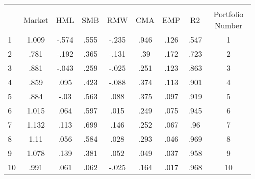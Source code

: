 {
\def\sym#1{\ifmmode^{#1}\else\(^{#1}\)\fi}
\begin{tabular}{l*{1}{cccccccc}}
\hline\hline
            &\multicolumn{8}{c}{}                                                                                   \\
            &     Market &         HML&         SMB&         RMW&         CMA&         EMP&          R2&Portfolio Number\\
\hline
1           &       1.009&       -.574&        .555&       -.235&        .946&        .126&        .547&           1\\
2           &        .781&       -.192&        .365&       -.131&         .39&        .172&        .723&           2\\
3           &        .881&       -.043&        .259&       -.025&        .251&        .123&        .863&           3\\
4           &        .859&        .095&        .423&       -.088&        .374&        .113&        .901&           4\\
5           &        .884&        -.03&        .563&        .088&        .375&        .097&        .919&           5\\
6           &       1.015&        .064&        .597&        .015&        .249&        .075&        .945&           6\\
7           &       1.132&        .113&        .699&        .146&        .252&        .067&         .96&           7\\
8           &        1.11&        .056&        .584&        .028&        .293&        .046&        .969&           8\\
9           &       1.078&        .139&        .381&        .052&        .049&        .037&        .958&           9\\
10          &        .991&        .061&        .062&       -.025&        .164&        .017&        .968&          10\\
\hline\hline
\end{tabular}
}
